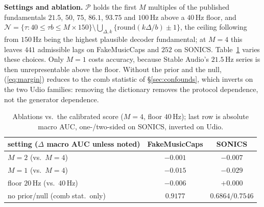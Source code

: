 \documentclass{article}
\begin{document}
\noindent\textbf{Settings and ablation.} $\mathcal{P}$ holds the first $M$ multiples
of the published fundamentals $21.5$, $50$, $75$, $86.1$, $93.75$ and $100$\,Hz above
a $40$\,Hz floor, and $\mathcal{N} = \{\tau : 40 \le \tau b \le M{\times}150\}
\setminus \bigcup_{\Delta,k} \{\mathrm{round}(k\Delta/b) \pm 1\}$, the ceiling
following from $150$\,Hz being the highest plausible decoder fundamental; at
$M{=}4$ this leaves $441$ admissible lags on FakeMusicCaps and $252$ on SONICS.
Table~\ref{tab:ablation} varies these choices. Only $M{=}1$ costs accuracy, because
Stable Audio's $21.5$\,Hz series is then unrepresentable above the floor. Without the
prior and the null, (\ref{eq:margin}) reduces to the comb statistic of
\S\ref{sec:confounds}, which inverts on the two Udio families: removing the
dictionary removes the protocol dependence, not the generator dependence.

\begin{table}[t]
\centering
\caption{Ablations vs.\ the calibrated score ($M{=}4$, floor $40$\,Hz); last row
is absolute macro AUC, one-/two-sided on SONICS, inverted on Udio.}
\label{tab:ablation}
{\footnotesize
\begin{tabular}{@{}lcc@{}}
\toprule
setting ($\Delta$ macro AUC unless noted) & FakeMusicCaps & SONICS \\
\midrule
$M{=}2$ (vs.\ $M{=}4$) & $-0.001$ & $-0.007$ \\
$M{=}1$ (vs.\ $M{=}4$) & $-0.015$ & $-0.029$ \\
floor $20$\,Hz (vs.\ $40$\,Hz) & $-0.006$ & $+0.000$ \\
no prior/null (comb stat.\ only) & $0.9177$ & $0.6864/0.7546$ \\
\bottomrule
\end{tabular}}
\end{table}
\end{document}
